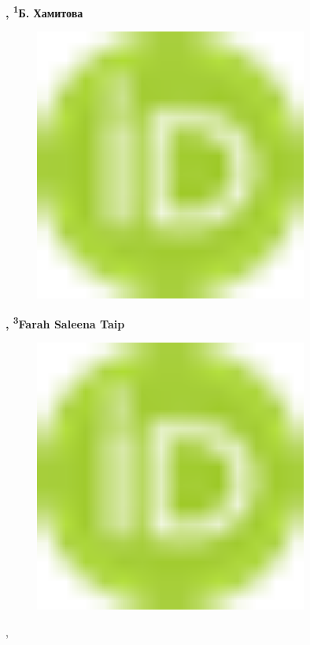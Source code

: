 {\bfseries ,
\textsuperscript{1}Б.
Хамитова}
\begin{figure}[H]
	\centering
	\includegraphics[width=0.8\textwidth]{media/pish/image10}
	\caption*{}
\end{figure}
{\bfseries ,
\textsuperscript{3}Farah Saleena
Taip}
\begin{figure}[H]
	\centering
	\includegraphics[width=0.8\textwidth]{media/pish/image10}
	\caption*{}
\end{figure}
,

